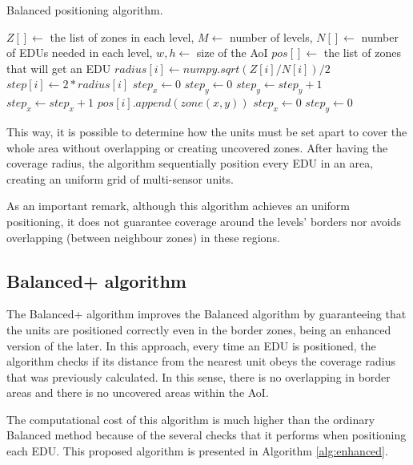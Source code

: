 \begin{refsection}
\begin{algorithm}[ht!]
  \caption{Balanced positioning algorithm.}\label{alg:balanced}
  \begin{algorithmic}
    \REQUIRE $Z[] \gets$ the list of zones in each level, $M \gets$ number of levels, $N[] \gets$ number of EDUs needed in each level, $w, h \gets$ size of the AoI
    \ENSURE $pos[] \gets$ the list of zones that will get an EDU
      \STATE $radius[i] \gets numpy.sqrt(Z[i] / N[i]) / 2$
      \STATE $step[i] \gets 2 * radius[i]$
    \ENDFOR
    \STATE $step_x \gets 0$
    \STATE $step_y \gets 0$
      \STATE $step_y \gets step_y + 1$
        \STATE $step_x \gets step_x + 1$
            \STATE $pos[i].append(zone(x, y))$
            \STATE $step_x \gets 0$
            \STATE $step_y \gets 0$
          \ENDIF
        \ENDFOR
      \ENDFOR
    \ENDFOR
  \end{algorithmic}
\end{algorithm}

This way, it is possible to determine how the units must be set apart to cover the whole area without overlapping or creating uncovered zones. After having the coverage radius, the algorithm sequentially position every EDU in an area, creating an uniform grid of multi-sensor units.

As an important remark, although this algorithm achieves an uniform positioning, it does not guarantee coverage around the levels' borders nor avoids overlapping (between neighbour zones) in these regions.

\subsection {Balanced+ algorithm}

The Balanced+ algorithm improves the Balanced algorithm by guaranteeing that the units are positioned correctly even in the border zones, being an enhanced version of the later. In this approach, every time an EDU is positioned, the algorithm checks if its distance from the nearest unit obeys the coverage radius that was previously calculated. In this sense, there is no overlapping in border areas and there is no uncovered areas within the AoI.

The computational cost of this algorithm is much higher than the ordinary Balanced method because of the several checks that it performs when positioning each EDU. This proposed algorithm is presented in Algorithm \ref{alg:enhanced}.


\end{refsection}
